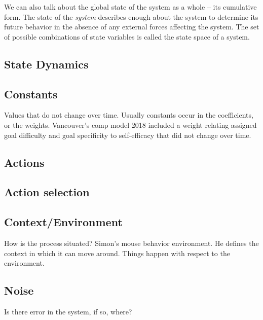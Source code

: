 \documentclass[english,,man]{apa6}
\theoremstyle{definition}
\theoremstyle{definition}
\theoremstyle{definition}
\theoremstyle{remark}
\begin{document}
We can also talk about the global state of the system as a whole -- its
cumulative form. The state of the \emph{system} describes enough about
the system to determine its future behavior in the absence of any
external forces affecting the system. The set of possible combinations
of state variables is called the state space of a system.

\hypertarget{state-dynamics}{%
\subsection{State Dynamics}\label{state-dynamics}}

\hypertarget{constants}{%
\subsection{Constants}\label{constants}}

Values that do not change over time. Usually constants occur in the
coefficients, or the weights. Vancouver's comp model 2018 included a
weight relating assigned goal difficulty and goal specificity to
self-efficacy that did not change over time.

\hypertarget{actions}{%
\subsection{Actions}\label{actions}}

\hypertarget{action-selection}{%
\subsection{Action selection}\label{action-selection}}

\hypertarget{contextenvironment}{%
\subsection{Context/Environment}\label{contextenvironment}}

How is the process situated? Simon's mouse behavior environment. He
defines the context in which it can move around. Things happen with
respect to the environment.

\hypertarget{noise}{%
\subsection{Noise}\label{noise}}

Is there error in the system, if so, where?
\end{document}
